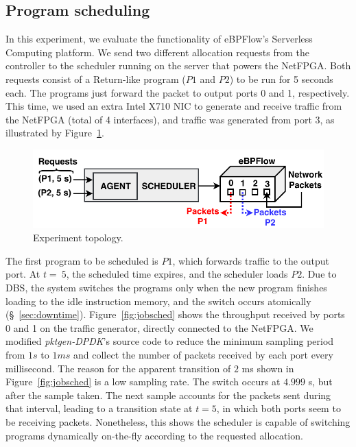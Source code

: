 \subsection{Program scheduling}

In this experiment, we evaluate the functionality of eBPFlow's Serverless Computing platform. We send two different allocation requests from the controller to the scheduler running on the server that powers the NetFPGA. Both requests consist of a Return-like program ($P1$ and $P2$) to be run for 5 seconds each. The programs just forward the packet to output ports 0 and 1, respectively. This time, we used an extra Intel X710 NIC to generate and receive traffic from the NetFPGA (total of 4 interfaces), and traffic was generated from port 3, as illustrated by Figure~\ref{fig:request}.
 
\begin{figure}[t]
\centering
\includegraphics[width=1.0\columnwidth]{figures/request.pdf}
\caption{Experiment topology.}
\label{fig:request}
\end{figure}

The first program to be scheduled is $P1$, which forwards traffic to the output port. At $t=~5$, the scheduled time expires, and the scheduler loads $P2$. Due to DBS, the system switches the programs only when the new program finishes loading to the idle instruction memory, and the switch occurs atomically (\S~\ref{sec:downtime}). Figure~\ref{fig:jobsched} shows the throughput received by ports 0 and 1 on the traffic generator, directly connected to the NetFPGA. We modified \textit{pktgen-DPDK}'s source code to reduce the minimum sampling period from $1 s$ to $1 ms$ and collect the number of packets received by each port every millisecond. The reason for the apparent transition of $2$ ms shown in Figure~\ref{fig:jobsched} is a low sampling rate. The switch occurs at $4.999$ s, but after the sample taken. The next sample accounts for the packets sent during that interval, leading to a transition state at $t=5$, in which both ports seem to be receiving packets. Nonetheless, this shows the scheduler is capable of switching programs dynamically on-the-fly according to the requested allocation.

